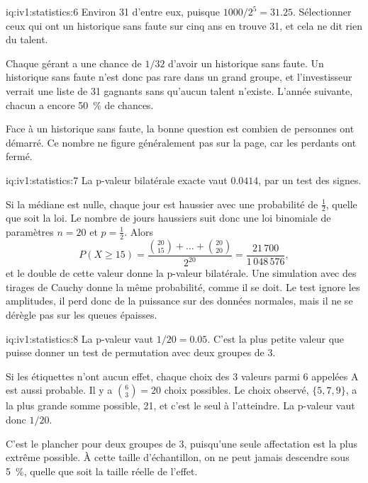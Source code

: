 \begin{solution}{iq:iv1:statistics:6}
Environ 31 d'entre eux, puisque $1000/2^5 = 31.25$. Sélectionner ceux qui ont un historique sans faute sur cinq ans en trouve 31, et cela ne dit rien du talent.

Chaque gérant a une chance de $1/32$ d'avoir un historique sans faute. Un historique sans faute n'est donc pas rare dans un grand groupe, et l'investisseur verrait une liste de 31 gagnants sans qu'aucun talent n'existe. L'année suivante, chacun a encore 50~\% de chances.

Face à un historique sans faute, la bonne question est combien de personnes ont démarré. Ce nombre ne figure généralement pas sur la page, car les perdants ont fermé.

\end{solution}

\begin{solution}{iq:iv1:statistics:7}
La p-valeur bilatérale exacte vaut $0.0414$, par un test des signes.

Si la médiane est nulle, chaque jour est haussier avec une probabilité de $\tfrac12$, quelle que soit la loi. Le nombre de jours haussiers suit donc une loi binomiale de paramètres $n = 20$ et $p = \tfrac12$. Alors
\[
P(X \ge 15) = \frac{\binom{20}{15} + \dots + \binom{20}{20}}{2^{20}} = \frac{21\,700}{1\,048\,576},
\]
et le double de cette valeur donne la p-valeur bilatérale. Une simulation avec des tirages de Cauchy donne la même probabilité, comme il se doit. Le test ignore les amplitudes, il perd donc de la puissance sur des données normales, mais il ne se dérègle pas sur les queues épaisses.

\end{solution}

\begin{solution}{iq:iv1:statistics:8}
La p-valeur vaut $1/20 = 0.05$. C'est la plus petite valeur que puisse donner un test de permutation avec deux groupes de 3.

Si les étiquettes n'ont aucun effet, chaque choix des 3 valeurs parmi 6 appelées A est aussi probable. Il y a $\binom{6}{3} = 20$ choix possibles. Le choix observé, $\{5, 7, 9\}$, a la plus grande somme possible, 21, et c'est le seul à l'atteindre. La p-valeur vaut donc $1/20$.

C'est le plancher pour deux groupes de 3, puisqu'une seule affectation est la plus extrême possible. À cette taille d'échantillon, on ne peut jamais descendre sous 5~\%, quelle que soit la taille réelle de l'effet.

\end{solution}

